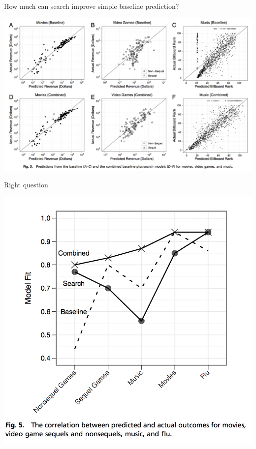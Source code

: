 \documentclass[aspectratio=169]{beamer}
\def\vf{\vfill}
\begin{document}
\begin{frame}

How much can search improve simple baseline prediction?
\begin{center}
\includegraphics[width=\textwidth]{figures/goel_predicting_2010_fig3}
\end{center}
\vf
Right question

\end{frame}
\begin{frame}

\begin{center}
\includegraphics[width=\textwidth]{figures/goel_predicting_2010_fig5}
\end{center}

\end{frame}
\end{document}

